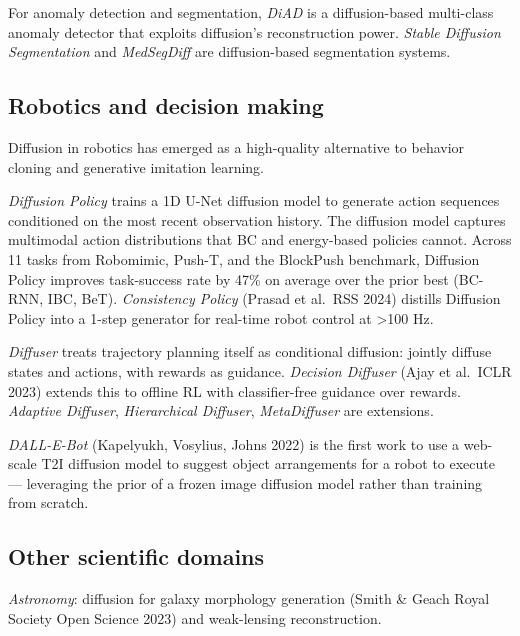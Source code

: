 \documentclass{article}
\begin{document}
For anomaly detection and segmentation, \emph{DiAD} \citep{he20242024} is a diffusion-based multi-class anomaly detector that exploits diffusion's reconstruction power. \emph{Stable Diffusion Segmentation} \citep{lin2023diffusionmodelsfor} and \emph{MedSegDiff} are diffusion-based segmentation systems.

\subsection{Robotics and decision making}\label{robotics-and-decision-making}

Diffusion in robotics has emerged as a high-quality alternative to behavior cloning and generative imitation learning.

\emph{Diffusion Policy} \citep{chi2023diffusionpolicyvis} trains a 1D U-Net diffusion model to generate action sequences conditioned on the most recent observation history. The diffusion model captures multimodal action distributions that BC and energy-based policies cannot. Across 11 tasks from Robomimic, Push-T, and the BlockPush benchmark, Diffusion Policy improves task-success rate by 47\% on average over the prior best (BC-RNN, IBC, BeT). \emph{Consistency Policy} (Prasad et al.~RSS 2024) distills Diffusion Policy into a 1-step generator for real-time robot control at \textgreater100 Hz.

\emph{Diffuser} \citep{janner2022planningwithdiffus} treats trajectory planning itself as conditional diffusion: jointly diffuse states and actions, with rewards as guidance. \emph{Decision Diffuser} (Ajay et al.~ICLR 2023) extends this to offline RL with classifier-free guidance over rewards. \emph{Adaptive Diffuser}, \emph{Hierarchical Diffuser}, \emph{MetaDiffuser} are extensions.

\emph{DALL-E-Bot} (Kapelyukh, Vosylius, Johns 2022) is the first work to use a web-scale T2I diffusion model to suggest object arrangements for a robot to execute --- leveraging the prior of a frozen image diffusion model rather than training from scratch.

\subsection{Other scientific domains}\label{other-scientific-domains}

\emph{Astronomy}: diffusion for galaxy morphology generation (Smith \& Geach Royal Society Open Science 2023) and weak-lensing reconstruction.
\end{document}
